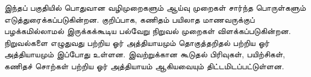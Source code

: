 \documentclass[../../include/open-logic-part]{subfiles}
\begin{document}

\begin{editorial}
  இந்தப் பகுதியில் பொதுவான வழிமுறைகளும் ஆய்வு முறைகள் சார்ந்த
  பொருள்களும் எடுத்துரைக்கப்படுகின்றன. குறிப்பாக, கணிதம் பயிலாத
  மாணவருக்குப் பழக்கமில்லாமல் இருக்கக்கூடிய பல்வேறு நிறுவல் முறைகள்
  விளக்கப்படுகின்றன. நிறுவல்களை எழுதுவது பற்றிய ஓர் அத்தியாயமும்
  தொகுத்தறிதல் பற்றிய ஓர் அத்தியாயமும் இப்போது உள்ளன. இவற்றுக்கான
  கூடுதல் பிரிவுகள், பயிற்சிகள், கணிதச் சொற்கள் பற்றிய ஓர் அத்தியாயம்
  ஆகியவையும் திட்டமிடப்பட்டுள்ளன.
\end{editorial}



\OLEndPartHook
\end{document}
